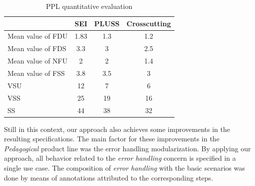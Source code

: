 \documentclass{report}
\begin{document}
\begin{frontmatter}
{\begin{table}[hb]
\centering
\nocaptionrule \caption{PPL quantitative evaluation}
\label{tab:ppl-metrics}
\begin{small}
\begin{tabular}{lccc} \hline
					& SEI 	& PLUSS 	& Crosscutting	\\ \hline
Mean value of FDU 		& 1.83	& 1.3	& 1.2	\\
Mean value of FDS 		& 3.3	& 3		& 2.5	\\
Mean value of NFU 		& 2		& 2		& 1.4	\\
Mean value of FSS 		& 3.8	& 3.5	& 3		\\ 
VSU 					& 12		& 7		& 6		\\
VSS 					& 25		& 19		& 16		\\
SS 					& 44		& 38		& 32		\\	\hline
\end{tabular}
\end{small}
\end{table}

Still in this context, our approach also achieves some improvements in the resulting specifications. The main factor for these improvements in the \emph{Pedagogical} product line was the error handling modularization. By applying our approach, all behavior related to the \emph{error handling} concern is specified in a single use case. The composition of \emph{error handling} with the basic scenarios was done by means of annotations attributed to the corresponding steps. 


%    

}
\end{frontmatter}
\end{document}
